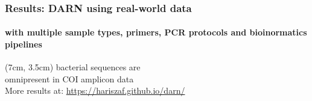 \documentclass{beamer}
\begin{document}
   \begin{frame}
      \frametitle{Results: DARN using real-world data}
      \framesubtitle{with multiple sample types, primers, PCR protocols and bioinormatics pipelines}


      \begin{textblock*}{6cm}(7cm, 3.5cm)
         bacterial sequences are \\ 
         omnipresent in COI amplicon data \\
         \bigskip
         More results at:
         \href{https://hariszaf.github.io/darn/}{https://hariszaf.github.io/darn/} \\
      \end{textblock*}
   \end{frame}
\end{document}
